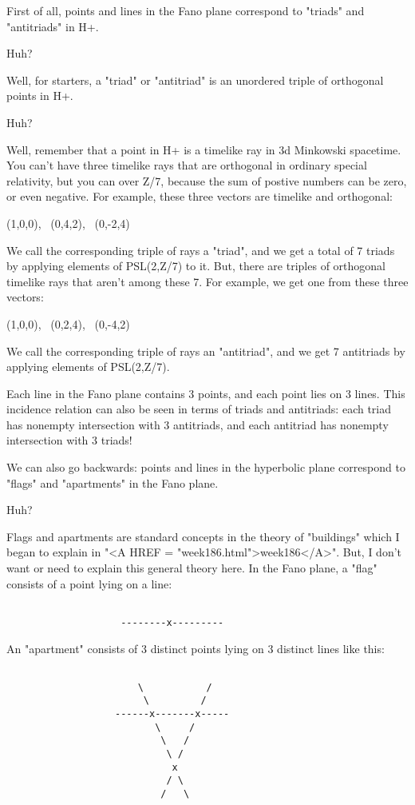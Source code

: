 First of all, points and lines in the Fano plane correspond to "triads" and 
"antitriads" in H+.

Huh?  

Well, for starters, a "triad" or "antitriad" is an unordered triple of orthogonal 
points in H+.   

Huh?  

Well, remember that a point in H+ is a timelike ray in 3d Minkowski spacetime.
You can't have three timelike rays that are orthogonal in ordinary special 
relativity, but you can over Z/7, because the sum of postive numbers can be zero, 
or even negative.  For example, these three vectors are timelike and orthogonal:

(1,0,0), \  (0,4,2),  \  (0,-2,4)

We call the corresponding triple of rays a 
"triad", and we get a total of 7 triads 
by applying elements of PSL(2,Z/7) to it.  But, there are triples of orthogonal 
timelike rays that aren't among these 7.  For example, we get one from these three 
vectors:

(1,0,0),  \  (0,2,4), \  (0,-4,2)

We call the corresponding triple of rays an "antitriad", 
and we get 7  
antitriads by applying elements of PSL(2,Z/7).

Each line in the Fano plane contains 3 points, and each point lies on 3
lines.  This incidence relation can also be seen in terms of triads and
antitriads: each triad has nonempty intersection with 3 antitriads, and
each antitriad has nonempty intersection with 3 triads!

We can also go backwards: points and lines in the hyperbolic plane correspond
to "flags" and "apartments" in the Fano plane.  

Huh?

Flags and apartments are standard concepts in the 
theory of "buildings"
which I began to explain in "<A HREF = "week186.html">week186</A>".  
But, I don't want or need to explain
this general theory here.  In the Fano plane, a "flag" 
consists of a point
lying on a line:

\begin{verbatim}
                  
                    --------x---------
\end{verbatim}
    
An "apartment" 
consists of 3 distinct points lying on 3 distinct lines like
this:

\begin{verbatim}

                       \           /
                        \         /
                   ------x-------x-----
                          \     /
                           \   /
                            \ /
                             x
                            / \
                           /   \
\end{verbatim}
    
